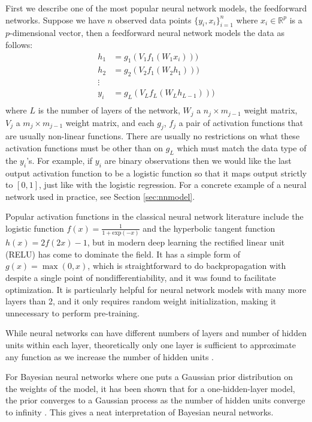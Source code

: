 \documentclass[12pt]{report}
\begin{document}
First we describe one of the most popular neural network models, the feedforward networks. Suppose we have $n$ observed data points $\{y_i,x_i\}_{i=1}^n$ where $x_i \in
\mathbb{R}^p$ is a $p$-dimensional vector, then a feedforward neural network models the
data as follows:
\begin{align*}
h_1 &= g_1(V_1f_1(W_1 x_i)))\\
h_2 &= g_2(V_2f_1(W_2 h_1))) \\
\vdots& \\
y_i &= g_L(V_Lf_L(W_L h_{L-1})))\\
\end{align*}
where $L$ is the number of layers of the network, $W_j$ a $n_j \times m_{j-1}$
weight matrix, $V_j$ a $m_j \times m_{j-1}$ weight matrix, and each $g_j$, $f_j$
a pair of activation functions that are usually non-linear functions. There are
usually no restrictions on what these activation functions must be other than on
$g_L$ which must match the data type of the $y_i$'s. For example, if $y_i$ are
binary observations then we would like the last output activation function to be a
logistic function so that it maps output strictly to $[0,1]$, just like with the
logistic regression. For a concrete example of a neural network used in practice, see Section \ref{sec:nnmodel}.

Popular activation functions in the classical neural network literature include
the logistic function $f(x) = \frac{1}{1+\text{exp}(-x)} $ and the hyperbolic tangent function $h(x) =  2f(2x)-1$, but in modern deep
learning the rectified linear unit (RELU) has come to dominate the field. It has
a simple form of $g(x)=\max(0,x)$, which is straightforward to do
backpropagation with despite a single point of nondifferentiability, and it was
found to facilitate optimization. It is particularly helpful for
neural network models with many more layers than 2, and it only requires random weight initialization, making it unnecessary to perform pre-training. 

While neural networks can have different numbers of layers and number of hidden
units within each layer, theoretically only one layer is sufficient to
approximate any function as we increase the number of hidden units \cite{hornik1991approximation}. 

For Bayesian neural networks where one puts a Gaussian prior distribution on the weights of the model, it has been shown that for a one-hidden-layer model, the prior converges to a Gaussian process as the number of hidden units converge to infinity \cite{neal2012bayesian}. This gives a neat interpretation of Bayesian neural networks. 
\end{document}
